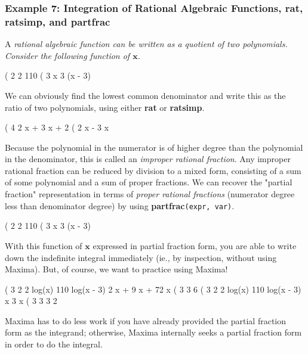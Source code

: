 \documentclass[12pt]{article}
\begin{document}
\subsubsection*{Example 7: Integration of Rational Algebraic Functions, \textbf{rat},
    \textbf{ratsimp}, and \textbf{partfrac} }
A \it rational algebraic function \rm can be written as a quotient of two polynomials.
Consider the following function of $\mathbf{x}$.
\begin{myVerbatim}
(%
                         2          2       110
(%
                                   3 x   3 (x - 3)
\end{myVerbatim} 
We can obviously find the lowest common denominator and write this
  as the ratio of two polynomials, using either \textbf{rat} or \textbf{ratsimp}.
\begin{myVerbatim}
(%
                                  4      2
                                 x  + 3 x  + 2
(%
                                    2
                                   x  - 3 x
\end{myVerbatim} 
Because the polynomial in the numerator is of higher degree than the polynomial in
  the denominator, this is called an \textit{improper rational fraction}.
Any improper rational fraction can be reduced by division to a mixed form, consisting
  of a sum of some polynomial and a sum of proper fractions.
We can recover the "partial fraction" representation in terms of \textit{proper rational fractions}
  (numerator degree less than denominator degree) by using \textbf{partfrac}\verb|(expr, var)|.
\begin{myVerbatim}
(%
                         2          2       110
(%
                                   3 x   3 (x - 3)
\end{myVerbatim} 
With this function of $\mathbf{x}$ expressed in partial fraction form, you are
  able to write down the indefinite integral immediately (ie., by inspection,
  without using Maxima).
But, of course, we want to practice using Maxima!
\begin{myVerbatim}
(%
                                                3      2
                 2 log(x)   110 log(x - 3)   2 x  + 9 x  + 72 x
(%
                    3             3                  6
(%
                                               3      2
                  2 log(x)   110 log(x - 3)   x    3 x
(%
                     3             3          3     2
\end{myVerbatim} 
Maxima has to do less work if you have already provided the partial fraction
  form as the integrand; otherwise, Maxima internally seeks a partial fraction form in order
  to do the integral.  
\newpage
\end{document}
